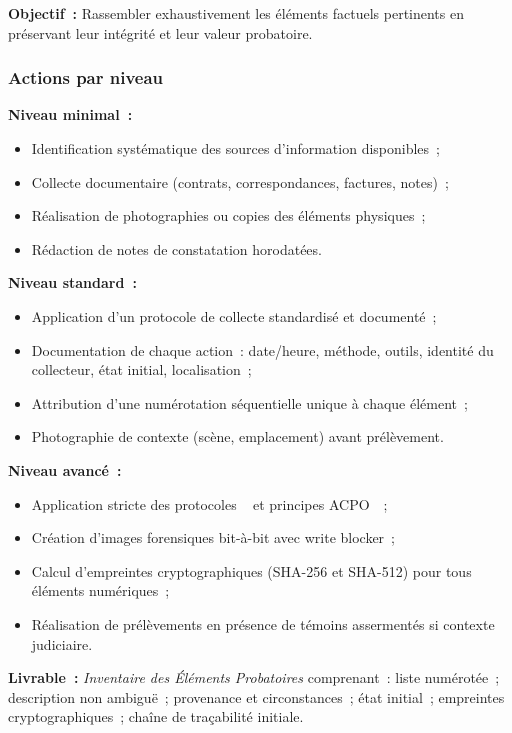 \textbf{Objectif~:} Rassembler exhaustivement les éléments factuels pertinents
en préservant leur intégrité et leur valeur probatoire.

\subsubsection*{Actions par niveau}

\textbf{Niveau minimal~:}
\begin{itemize}
    \item Identification systématique des sources d'information disponibles~;
    \item Collecte documentaire (contrats, correspondances, factures, notes)~;
    \item Réalisation de photographies ou copies des éléments physiques~;
    \item Rédaction de notes de constatation horodatées.
\end{itemize}

\textbf{Niveau standard~:}
\begin{itemize}
    \item Application d'un protocole de collecte standardisé et documenté~;
    \item Documentation de chaque action~: date/heure, méthode, outils,
          identité du collecteur, état initial, localisation~;
    \item Attribution d'une numérotation séquentielle unique à chaque élément~;
    \item Photographie de contexte (scène, emplacement) avant prélèvement.
\end{itemize}

\textbf{Niveau avancé~:}
\begin{itemize}
    \item Application stricte des protocoles ~\cite{iso27037} et
          principes ACPO~\cite{acpo2012}~;
    \item Création d'images forensiques bit-à-bit avec write blocker~;
    \item Calcul d'empreintes cryptographiques (SHA-256 et SHA-512) pour
          tous éléments numériques~;
    \item Réalisation de prélèvements en présence de témoins assermentés
          si contexte judiciaire.
\end{itemize}

\textbf{Livrable~:} \textit{Inventaire des Éléments Probatoires} comprenant~:
liste numérotée~; description non ambiguë~; provenance et circonstances~;
état initial~; empreintes cryptographiques~; chaîne de traçabilité initiale.

